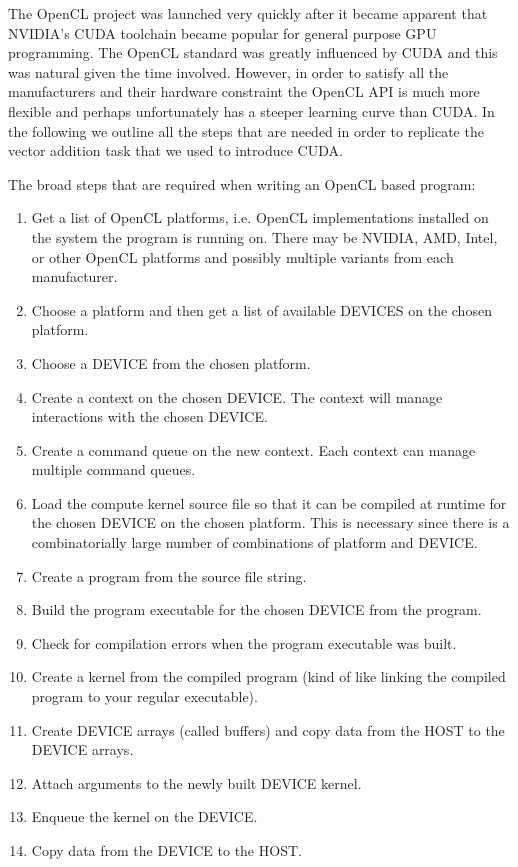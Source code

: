 The OpenCL project was launched very quickly after it became apparent that NVIDIA's CUDA toolchain became popular for general purpose GPU programming. The OpenCL standard was greatly influenced by CUDA and this was natural given the time involved. However, in order to satisfy all the manufacturers and their hardware constraint the OpenCL API is much more flexible and perhaps unfortunately has a steeper learning curve than CUDA. In the following we outline all the steps that are needed in order to replicate the vector addition task that we used to introduce CUDA.

The broad steps that are required when writing an OpenCL based program:

\begin{enumerate}
\item Get a list of OpenCL platforms, i.e. OpenCL implementations installed on the system the program is running on. There may be NVIDIA, AMD, Intel, or other OpenCL platforms and possibly multiple variants from each manufacturer.
\item Choose a platform and then get a list of available DEVICES on the chosen platform.
\item Choose a DEVICE from the chosen platform.
\item Create a context on the chosen DEVICE. The context will manage interactions with the chosen DEVICE.
\item Create a command queue on the new context. Each context can manage multiple command queues.
\item Load the compute kernel source file so that it can be compiled at runtime for the chosen DEVICE on the chosen platform. This is necessary since there is a combinatorially large number of combinations of platform and DEVICE.
\item Create a program from the source file string. 
\item Build the program executable for the chosen DEVICE from the program.
\item Check for compilation errors when the program executable was built.
\item Create a kernel from the compiled program (kind of like linking the compiled program to your regular executable).
\item Create DEVICE arrays (called buffers) and copy data from the HOST to the DEVICE arrays.
\item Attach arguments to the newly built DEVICE kernel.

\item Enqueue the kernel on the DEVICE.
\item Copy data from the DEVICE to the HOST.
\end{enumerate}

